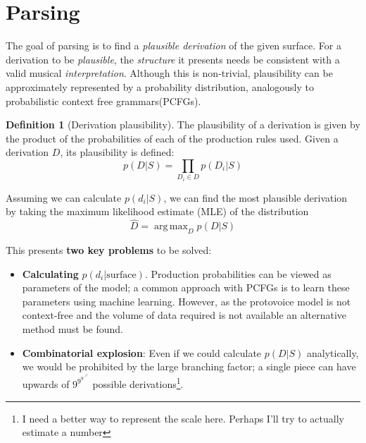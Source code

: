 \documentclass[12pt,a4paper,twoside,openright]{report}
\DeclareMathOperator*{\argmax}{arg\,max}
\theoremstyle{definition}
\newtheorem{definition}{Definition}[section]
\begin{document}
\section{Parsing} %
\label{sub:protovoiceParsing}

The goal of parsing is to find a \textit{plausible derivation} of the given surface. For a derivation to be \textit{plausible}, the \textit{structure} it presents needs be consistent with a valid musical \textit{interpretation}. Although this is non-trivial, plausibility can be approximately represented by a probability distribution, analogously to probabilistic context free grammars(PCFGs).
\par
\par
\begin{definition}[Derivation plausibility]
  The plausibility of a derivation is given by the product of the probabilities of each of the production rules used. Given a derivation $D$, its plausibility is defined:
  \begin{equation}
    p(D|S) = \prod_{D_i \in D}  p(D_i|S)
  \end{equation}
\end{definition}


Assuming we can calculate $p(d_i|S)$, we can find the most plausible derivation by taking the maximum likelihood estimate (MLE) of the distribution
\begin{equation}
  \hat D = \argmax_{D}  p(D|S)
  \label{eq:mapApproach}
\end{equation}

This presents \textbf{two key problems} to be solved:

\begin{itemize}
  \item \textbf{Calculating} $p(d_i|\text{surface})$. Production probabilities can be viewed as parameters of the model; a common approach with PCFGs is to learn these parameters using machine learning. However, as the protovoice model is not context-free and the volume of data required is not available an alternative method must be found.
  \item \textbf{Combinatorial explosion}: Even if we could calculate $p(D|S)$ analytically, we would be prohibited by the large branching factor; a single piece can have upwards of $9^{9^{9^{{\iddots}^{9^{9}}}}}$ possible derivations\footnote{I need a better way to represent the scale here. Perhaps I'll try to actually estimate a number}.
\end{itemize}
\end{document}
